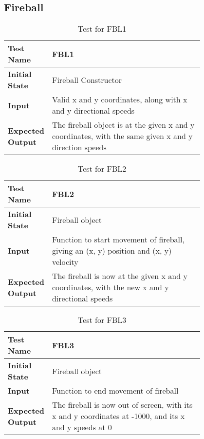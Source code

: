 \documentclass[12pt, titlepage]{article}
\begin{document}
\newpage


\subsection{Fireball}


\begin{table}[!htbp]
	
	\begin{tabular}[r]{|l|p{0.8\linewidth}|}
		
		\hline
		
		\textbf{Test Name} & FBL1 \\ 
		\hline
		\textbf{Initial State} & Fireball Constructor \\ 
		\hline
		\textbf{Input} & Valid x and y coordinates, along with x and y directional speeds \\ 
		\hline 
		\textbf{Expected Output} & The fireball object is at the given x and y coordinates, with the same given x and y direction speeds  \\ 
		\hline
		
	\end{tabular}
	\caption{Test for FBL1}
	\label{Table}
\end{table}

\begin{table}[!htbp]
	
	\begin{tabular}[r]{|l|p{0.8\linewidth}|}
		
		\hline
		
		\textbf{Test Name} & FBL2 \\ 
		\hline
		\textbf{Initial State} & Fireball object \\ 
		\hline
		\textbf{Input} & Function to start movement of fireball, giving an (x, y) position and (x, y) velocity \\ 
		\hline 
		\textbf{Expected Output} & The fireball is now at the given x and y coordinates, with the new x and y directional speeds  \\ 
		\hline
		
	\end{tabular}
	\caption{Test for FBL2}
	\label{Table}
\end{table}

\begin{table}[!htbp]
	
	\begin{tabular}[r]{|l|p{0.8\linewidth}|}
		
		\hline
		
		\textbf{Test Name} & FBL3 \\ 
		\hline
		\textbf{Initial State} & Fireball object \\ 
		\hline
		\textbf{Input} & Function to end movement of fireball \\ 
		\hline 
		\textbf{Expected Output} & The fireball is now out of screen, with its x and y coordinates at -1000, and its x and y speeds at 0  \\ 
		\hline
		
	\end{tabular}
	\caption{Test for FBL3}
	\label{Table}
\end{table}
\end{document}
